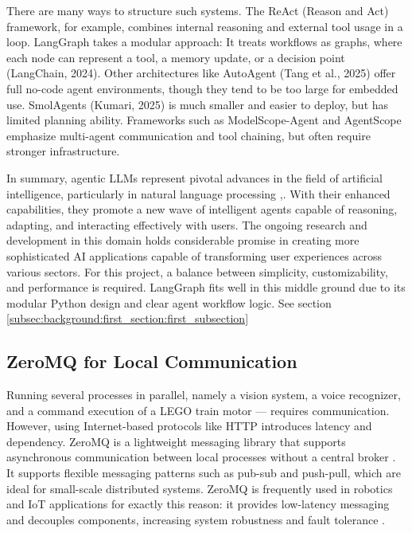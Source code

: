 There are many ways to structure such systems. The ReAct (Reason and Act) framework, for example, combines internal reasoning and external tool usage in a loop. LangGraph takes a modular approach: It treats workflows as graphs, where each node can represent a tool, a memory update, or a decision point (LangChain, 2024). Other architectures like AutoAgent (Tang et al., 2025) offer full no-code agent environments, though they tend to be too large for embedded use. SmolAgents (Kumari, 2025) is much smaller and easier to deploy, but has limited planning ability. Frameworks such as ModelScope-Agent and AgentScope emphasize multi-agent communication and tool chaining, but often require stronger infrastructure.

In summary, agentic LLMs represent pivotal advances in the field of artificial intelligence, particularly in natural language processing \cite{matthew_berman_ai_2024, ibm_technology_ai_2024, don_woodlock_using_2025},. With their enhanced capabilities, they promote a new wave of intelligent agents capable of reasoning, adapting, and interacting effectively with users. The ongoing research and development in this domain holds considerable promise in creating more sophisticated AI applications capable of transforming user experiences across various sectors. For this project, a balance between simplicity, customizability, and performance is required. LangGraph fits well in this middle ground due to its modular Python design and clear agent workflow logic. See section \autoref{subsec:background:first_section:first_subsection} 

\subsection{ZeroMQ for Local Communication}
\label{subsec:background:first_section:third_subsection}

Running several processes in parallel, namely a vision system, a voice recognizer, and a command execution of a LEGO train motor — requires communication. However, using Internet-based protocols like HTTP introduces latency and dependency. ZeroMQ is a lightweight messaging library that supports asynchronous communication between local processes without a central broker \cite{hintjens_zeromq_2013}. It supports flexible messaging patterns such as pub-sub and push-pull, which are ideal for small-scale distributed systems. ZeroMQ is frequently used in robotics and IoT applications for exactly this reason: it provides low-latency messaging and decouples components, increasing system robustness and fault tolerance \cite{wang_survey_2024, zhang-kennedy_systematic_2021}.



